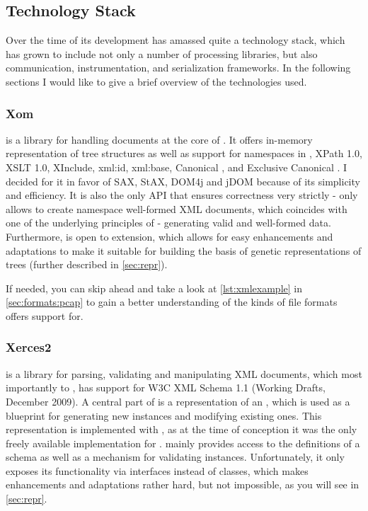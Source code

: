\subsection{Technology Stack}
\label{sec:tech}
Over the time of its development \xmlmate has amassed quite a technology stack, 
which has grown to include not only a number of \xml processing libraries, but also communication, instrumentation, and serialization frameworks. 
In the following sections I would like to give a brief overview of the technologies used.
\tocless\subsubsection{Xom}
\xom{}\cite{xom} is a \java library for handling \xml documents at the core of \xmlmate. 
It offers in-memory representation of \xml tree structures as well as support for namespaces in \xml, {\small
XPath 1.0}, {\small XSLT 1.0}, {\small XInclude}, {\small xml:id}, {\small xml:base}, Canonical \xml, and Exclusive Canonical \xml.
I decided for it in favor of {\small SAX}, {\small StAX}, {\small DOM4j} and {\small jDOM} because of its simplicity and efficiency.
It is also the only \xml API that ensures correctness very strictly - \xom only allows to create namespace well-formed XML documents, 
which coincides with one of the underlying principles of \xmlmate{} - generating valid and well-formed data.
Furthermore, \xom is open to extension, which allows for easy enhancements and adaptations to make it suitable 
for building the basis of genetic representations of \xml trees (further described in \cref{sec:repr}).

If needed, you can skip ahead and take a look at \cref{lst:xmlexample} in \cref{sec:formats:pcap}
to gain a better understanding of the kinds of file formats \xom offers support for.
\tocless\subsubsection{Xerces2}
\xerces{}\cite{xerces} is a \java library for parsing, validating and manipulating XML documents, which most
importantly to \xmlmate, has support for W3C XML Schema 1.1 (Working Drafts, December 2009).
A central part of \xmlmate is a representation of an \xsd, which is used as a blueprint for generating new
\xml instances and modifying existing ones. This representation is implemented with \xerces, as at the time of
conception it was the only freely available \xsd implementation for \java. \xerces mainly provides access to
the definitions of a schema as well as a mechanism for validating \xml instances. Unfortunately, it only
exposes its functionality via interfaces instead of classes, which makes enhancements and adaptations rather
hard, but not impossible, as you will see in \cref{sec:repr}.

